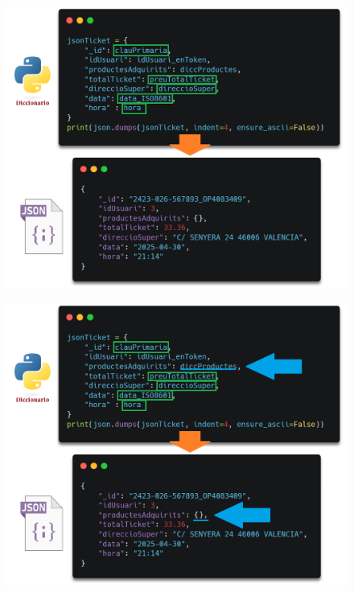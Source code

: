 \documentclass{beamer}
\begin{document}
		\begin{frame}
			\begin{figure}
				\centering
				\includegraphics[width=.8\linewidth]{imgEspecifiques/ticketExtraccioL.png}
				\label{fig:ticketExtraccioL}
			\end{figure}
		\end{frame}
		
		\begin{frame}
			\begin{figure}
				\centering
				\includegraphics[width=.8\linewidth]{imgEspecifiques/ticketExtraccioM.png}
				\label{fig:ticketExtraccioM}
			\end{figure}
		\end{frame}
	
	
\end{document}
